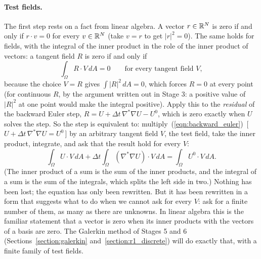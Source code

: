 \paragraph{Test fields.} The first step rests on a fact from linear algebra. A vector $r \in \mathbb{R}^N$ is zero if and only if $r \cdot v = 0$ for every $v \in \mathbb{R}^N$ (take $v = r$ to get $|r|^2 = 0$). The same holds for fields, with the integral of the inner product in the role of the inner product of vectors: a tangent field $R$ is zero if and only if
\begin{equation*}
\int_\Omega R\cdot V\, dA = 0 \qquad \text{for every tangent field } V ,
\end{equation*}
because the choice $V = R$ gives $\int |R|^2\, dA = 0$, which forces $R = 0$ at every point (for continuous $R$, by the argument written out in Stage 3: a positive value of $|R|^2$ at one point would make the integral positive). Apply this to the \emph{residual} of the backward Euler step, $R = U + \Delta t\, \nabla^*\nabla U - U^0$, which is zero exactly when $U$ solves the step. So the step is equivalent to: multiply~(\ref{eqn:backward_euler})~[\,$U + \Delta t\,\nabla^*\nabla U = U^0$\,] by an arbitrary tangent field $V$, the test field, take the inner product, integrate, and ask that the result hold for every $V$:
\begin{equation}
\label{eqn:r1_tested}
\int_\Omega U \cdot V\, dA + \Delta t \int_\Omega (\nabla^* \nabla U) \cdot V\, dA = \int_\Omega U^0 \cdot V\, dA .
\end{equation}
(The inner product of a sum is the sum of the inner products, and the integral of a sum is the sum of the integrals, which splits the left side in two.) Nothing has been lost; the equation has only been rewritten. But it has been rewritten in a form that suggests what to do when we cannot ask for every $V$: ask for a finite number of them, as many as there are unknowns. In linear algebra this is the familiar statement that a vector is zero when its inner products with the vectors of a basis are zero. The Galerkin method of Stages 5 and 6 (Sections~\ref{section:galerkin} and~\ref{section:r1_discrete}) will do exactly that, with a finite family of test fields.


